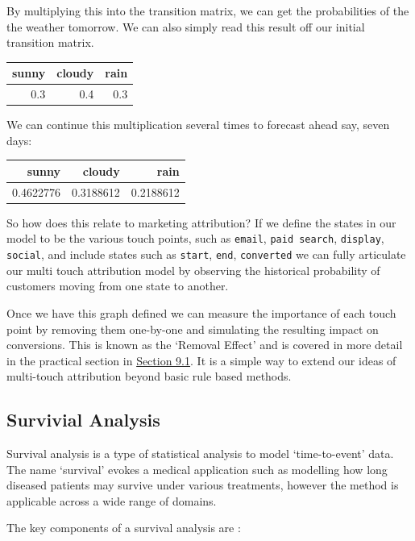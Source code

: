 \documentclass[]{book}
\begin{document}
By multiplying this into the transition matrix, we can get the probabilities of the
the weather tomorrow. We can also simply read this result off our initial transition
matrix.

\begin{tabular}{r|r|r}
\hline
sunny & cloudy & rain\\
\hline
0.3 & 0.4 & 0.3\\
\hline
\end{tabular}

We can continue this multiplication several times to forecast ahead say, seven
days:

\begin{tabular}{r|r|r}
\hline
sunny & cloudy & rain\\
\hline
0.4622776 & 0.3188612 & 0.2188612\\
\hline
\end{tabular}

So how does this relate to marketing attribution? If we define the states in our model
to be the various touch points, such as \texttt{email}, \texttt{paid\ search}, \texttt{display}, \texttt{social},
and include states such as \texttt{start}, \texttt{end}, \texttt{converted} we can fully articulate
our multi touch attribution model by observing the historical probability of
customers moving from one state to another.

Once we have this graph defined we can measure the importance of each touch point
by removing them one-by-one and simulating the resulting impact on conversions.
This is known as the `Removal Effect' \citep{removal2018} and is covered in more detail
in the practical section in \protect\hyperlink{markov-chains}{Section 9.1}. It is a simple
way to extend our ideas of multi-touch attribution beyond basic rule based
methods.

\hypertarget{survivial-analysis}{%
\subsection{Survivial Analysis}\label{survivial-analysis}}

Survival analysis is a type of statistical analysis to model `time-to-event'
data. The name `survival' evokes a medical application such as
modelling how long diseased patients may survive under various treatments, however
the method is applicable across a wide range of domains.

The key components of a survival analysis are \citep{noauthor_survival_2019}:
\end{document}
